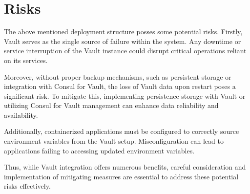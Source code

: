 \section{Risks}
The above mentioned deployment structure posses some potential risks. Firstly, Vault serves as the single source of failure within the system. Any downtime or service interruption of the Vault instance could disrupt critical operations reliant on its services. 

Moreover, without proper backup mechanisms, such as persistent storage or integration with Consul for Vault, the loss of Vault data upon restart poses a significant risk. To mitigate this, implementing persistence storage with Vault or utilizing Consul for Vault management can enhance data reliability and availability. 

Additionally, containerized applications must be configured to correctly source environment variables from the Vault setup. Misconfiguration can lead to applications failing to accessing updated environment variables.

Thus, while Vault integration offers numerous benefits, careful consideration and implementation of mitigating measures are essential to address these potential risks effectively.